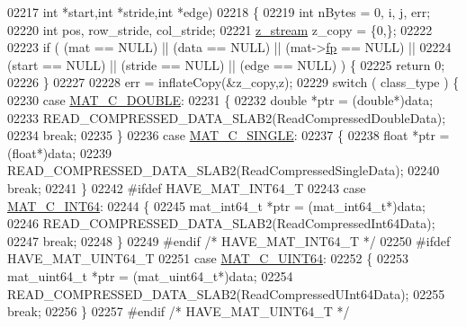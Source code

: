 \begin{DoxyCode}
{{{{{{{{{02217     \textcolor{keywordtype}{int} *start,\textcolor{keywordtype}{int} *stride,\textcolor{keywordtype}{int} *edge)
02218 \{
02219     \textcolor{keywordtype}{int} nBytes = 0, i, j, err;
02220     \textcolor{keywordtype}{int} pos, row\_stride, col\_stride;
02221     \hyperlink{structz__stream__s}{z\_stream} z\_copy = \{0,\};
02222 
02223     \textcolor{keywordflow}{if} ( (mat   == NULL) || (data   == NULL) || (mat->\hyperlink{struct__mat__t_a85f562e407ca9ad4d2a6e14f839432b7}{fp} == NULL) ||
02224          (start == NULL) || (stride == NULL) || (edge    == NULL) ) \{
02225         \textcolor{keywordflow}{return} 0;
02226     \}
02227 
02228     err = inflateCopy(&z\_copy,z);
02229     \textcolor{keywordflow}{switch} ( class\_type ) \{
02230         \textcolor{keywordflow}{case} \hyperlink{group___m_a_t_ggad4d60ae7b709fc81bfd744fb4c857c40a5d70e0862e5bdb7bd86bf7ba5948f307}{MAT\_C\_DOUBLE}:
02231         \{
02232             \textcolor{keywordtype}{double} *ptr = (\textcolor{keywordtype}{double}*)data;
02233             READ\_COMPRESSED\_DATA\_SLAB2(ReadCompressedDoubleData);
02234             \textcolor{keywordflow}{break};
02235         \}
02236         \textcolor{keywordflow}{case} \hyperlink{group___m_a_t_ggad4d60ae7b709fc81bfd744fb4c857c40a2825631e26a961cbe0f79db50a39cea2}{MAT\_C\_SINGLE}:
02237         \{
02238             \textcolor{keywordtype}{float} *ptr = (\textcolor{keywordtype}{float}*)data;
02239             READ\_COMPRESSED\_DATA\_SLAB2(ReadCompressedSingleData);
02240             \textcolor{keywordflow}{break};
02241         \}
02242 \textcolor{preprocessor}{#ifdef HAVE\_MAT\_INT64\_T}
02243         \textcolor{keywordflow}{case} \hyperlink{group___m_a_t_ggad4d60ae7b709fc81bfd744fb4c857c40a1ea83bcde49b35477494412973f82409}{MAT\_C\_INT64}:
02244         \{
02245             mat\_int64\_t *ptr = (mat\_int64\_t*)data;
02246             READ\_COMPRESSED\_DATA\_SLAB2(ReadCompressedInt64Data);
02247             \textcolor{keywordflow}{break};
02248         \}
02249 \textcolor{preprocessor}{#endif }\textcolor{comment}{/* HAVE\_MAT\_INT64\_T */}\textcolor{preprocessor}{}
02250 \textcolor{preprocessor}{#ifdef HAVE\_MAT\_UINT64\_T}
02251         \textcolor{keywordflow}{case} \hyperlink{group___m_a_t_ggad4d60ae7b709fc81bfd744fb4c857c40a86470e25c3763d9a24623f04326195dd}{MAT\_C\_UINT64}:
02252         \{
02253             mat\_uint64\_t *ptr = (mat\_uint64\_t*)data;
02254             READ\_COMPRESSED\_DATA\_SLAB2(ReadCompressedUInt64Data);
02255             \textcolor{keywordflow}{break};
02256         \}
02257 \textcolor{preprocessor}{#endif }\textcolor{comment}{/* HAVE\_MAT\_UINT64\_T */}\textcolor{preprocessor}{}
}}}}}}}}}
\end{DoxyCode}
